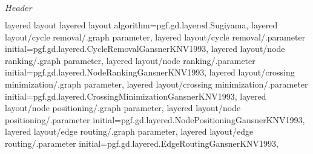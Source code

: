 %
%
%

\ProvidesFileRCS[v\pgfversion] $Header$






%
%




%
%
\pgfgddeclarealgorithmkey
  {layered layout}
  {layered layout}
  {
    algorithm=pgf.gd.layered.Sugiyama,
    layered layout/cycle removal/.graph parameter,
    layered layout/cycle removal/.parameter initial=pgf.gd.layered.CycleRemovalGansnerKNV1993,
    layered layout/node ranking/.graph parameter,
    layered layout/node ranking/.parameter initial=pgf.gd.layered.NodeRankingGansnerKNV1993,
    layered layout/crossing minimization/.graph parameter,
    layered layout/crossing minimization/.parameter initial=pgf.gd.layered.CrossingMinimizationGansnerKNV1993,
    layered layout/node positioning/.graph parameter,
    layered layout/node positioning/.parameter initial=pgf.gd.layered.NodePositioningGansnerKNV1993,
    layered layout/edge routing/.graph parameter,
    layered layout/edge routing/.parameter initial=pgf.gd.layered.EdgeRoutingGansnerKNV1993,
  }




\endinput

